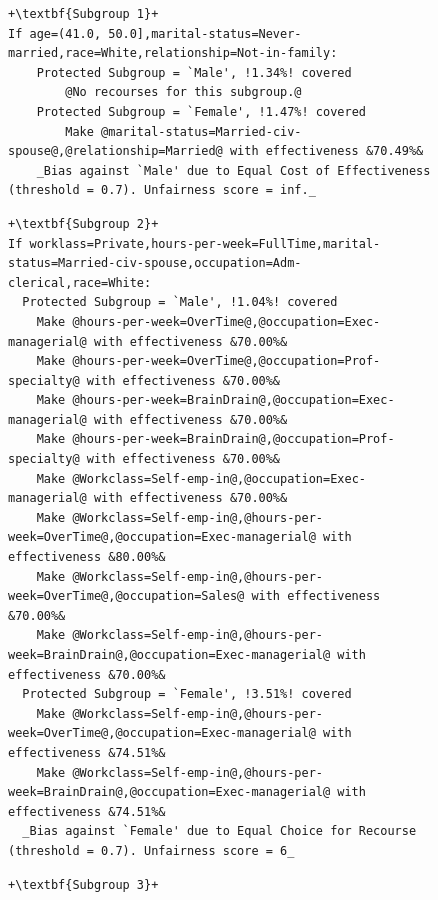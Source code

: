 \documentclass{article}
\begin{document}
\begin{figure}[ht]
\centering
\begin{minipage}{1\linewidth}

\begin{lstlisting}[style = base,escapechar=+]
+\textbf{Subgroup 1}+
If age=(41.0, 50.0],marital-status=Never-married,race=White,relationship=Not-in-family:
    Protected Subgroup = `Male', !1.34%! covered
        @No recourses for this subgroup.@
    Protected Subgroup = `Female', !1.47%! covered
        Make @marital-status=Married-civ-spouse@,@relationship=Married@ with effectiveness &70.49%&
    _Bias against `Male' due to Equal Cost of Effectiveness (threshold = 0.7). Unfairness score = inf._
\end{lstlisting}
\vspace{-5pt}
\begin{lstlisting}[style = base,escapechar=+]
+\textbf{Subgroup 2}+
If worklass=Private,hours-per-week=FullTime,marital-status=Married-civ-spouse,occupation=Adm-clerical,race=White:
  Protected Subgroup = `Male', !1.04%! covered
    Make @hours-per-week=OverTime@,@occupation=Exec-managerial@ with effectiveness &70.00%&
    Make @hours-per-week=OverTime@,@occupation=Prof-specialty@ with effectiveness &70.00%&
    Make @hours-per-week=BrainDrain@,@occupation=Exec-managerial@ with effectiveness &70.00%&
    Make @hours-per-week=BrainDrain@,@occupation=Prof-specialty@ with effectiveness &70.00%&
    Make @Workclass=Self-emp-in@,@occupation=Exec-managerial@ with effectiveness &70.00%&
    Make @Workclass=Self-emp-in@,@hours-per-week=OverTime@,@occupation=Exec-managerial@ with effectiveness &80.00%&
    Make @Workclass=Self-emp-in@,@hours-per-week=OverTime@,@occupation=Sales@ with effectiveness &70.00%&
    Make @Workclass=Self-emp-in@,@hours-per-week=BrainDrain@,@occupation=Exec-managerial@ with effectiveness &70.00%&
  Protected Subgroup = `Female', !3.51%! covered
    Make @Workclass=Self-emp-in@,@hours-per-week=OverTime@,@occupation=Exec-managerial@ with effectiveness &74.51%&
    Make @Workclass=Self-emp-in@,@hours-per-week=BrainDrain@,@occupation=Exec-managerial@ with effectiveness &74.51%&
  _Bias against `Female' due to Equal Choice for Recourse (threshold = 0.7). Unfairness score = 6_
\end{lstlisting}
\vspace{-5pt}
\begin{lstlisting}[style = base,escapechar=+]
+\textbf{Subgroup 3}+

\end{lstlisting}
\end{minipage}
\end{figure}
\end{document}
